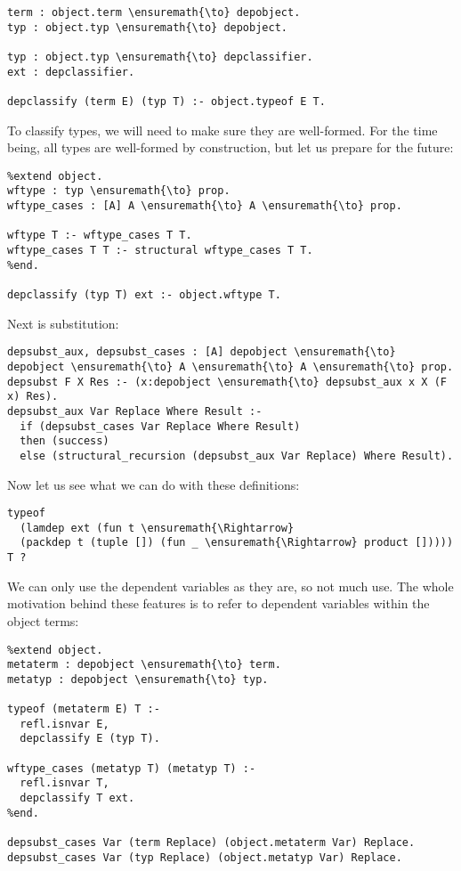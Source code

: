 \begin{verbatim}
term : object.term \ensuremath{\to} depobject.
typ : object.typ \ensuremath{\to} depobject.

typ : object.typ \ensuremath{\to} depclassifier.
ext : depclassifier.

depclassify (term E) (typ T) :- object.typeof E T.
\end{verbatim}

To classify types, we will need to make sure they are well-formed. For
the time being, all types are well-formed by construction, but let us
prepare for the future:

\begin{verbatim}
%extend object.
wftype : typ \ensuremath{\to} prop.
wftype_cases : [A] A \ensuremath{\to} A \ensuremath{\to} prop.

wftype T :- wftype_cases T T.
wftype_cases T T :- structural wftype_cases T T.
%end.

depclassify (typ T) ext :- object.wftype T.
\end{verbatim}

Next is substitution:

\begin{verbatim}
depsubst_aux, depsubst_cases : [A] depobject \ensuremath{\to} depobject \ensuremath{\to} A \ensuremath{\to} A \ensuremath{\to} prop.
depsubst F X Res :- (x:depobject \ensuremath{\to} depsubst_aux x X (F x) Res).
depsubst_aux Var Replace Where Result :-
  if (depsubst_cases Var Replace Where Result)
  then (success)
  else (structural_recursion (depsubst_aux Var Replace) Where Result).
\end{verbatim}

Now let us see what we can do with these definitions:

\begin{verbatim}
typeof
  (lamdep ext (fun t \ensuremath{\Rightarrow}
  (packdep t (tuple []) (fun _ \ensuremath{\Rightarrow} product [])))) T ?
\end{verbatim}

We can only use the dependent variables as they are, so not much use.
The whole motivation behind these features is to refer to dependent
variables within the object terms:

\begin{verbatim}
%extend object.
metaterm : depobject \ensuremath{\to} term.
metatyp : depobject \ensuremath{\to} typ.

typeof (metaterm E) T :-
  refl.isnvar E,
  depclassify E (typ T).
  
wftype_cases (metatyp T) (metatyp T) :-
  refl.isnvar T,
  depclassify T ext.
%end.

depsubst_cases Var (term Replace) (object.metaterm Var) Replace.
depsubst_cases Var (typ Replace) (object.metatyp Var) Replace.
\end{verbatim}

